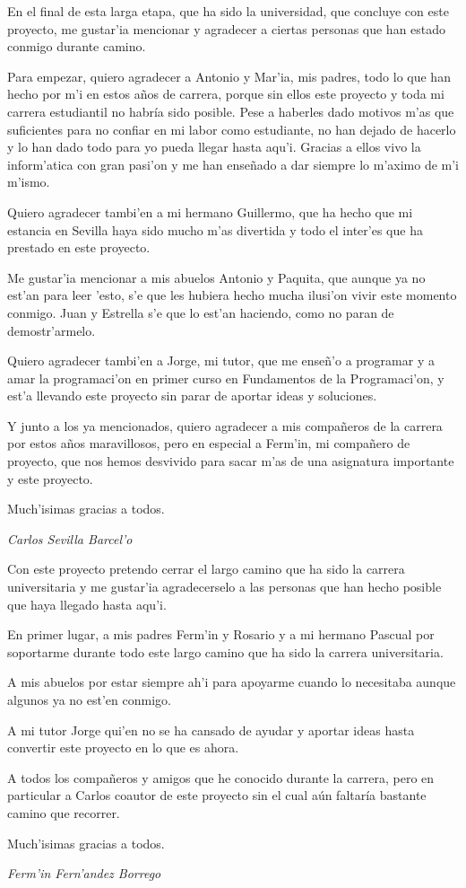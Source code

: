 
En el final de esta larga etapa, que ha sido la universidad, que concluye con este proyecto, me gustar'ia mencionar y agradecer a ciertas personas que han estado conmigo durante camino.

Para empezar, quiero agradecer a Antonio y Mar'ia, mis padres, todo lo que han hecho por m'i en estos años de carrera, porque sin ellos este proyecto y toda mi carrera estudiantil no habría sido posible.  Pese a haberles dado motivos m'as que suficientes para no confiar en mi labor como estudiante, no han dejado de hacerlo y lo han dado todo para yo pueda llegar hasta aqu'i. Gracias a ellos vivo la inform'atica con gran pasi'on y me han enseñado a dar siempre lo m'aximo de m'i m'ismo.

Quiero agradecer tambi'en a mi hermano Guillermo, que ha hecho que mi estancia en Sevilla haya sido mucho m'as divertida y todo el inter'es que ha prestado en este proyecto.

Me gustar'ia mencionar a mis abuelos Antonio y Paquita, que aunque ya no est'an para leer 'esto, s'e que les hubiera hecho mucha ilusi'on vivir este momento conmigo. Juan y Estrella s'e que lo est'an haciendo, como no paran de demostr'armelo.

Quiero agradecer tambi'en a Jorge, mi tutor, que me enseñ'o a programar y a amar la programaci'on en primer curso en Fundamentos de la Programaci'on, y est'a llevando este proyecto sin parar de aportar ideas y soluciones. 

Y junto a los ya mencionados, quiero agradecer a mis compañeros de la carrera por estos años maravillosos, pero en especial a Ferm'in, mi compañero de proyecto, que nos hemos desvivido para sacar m'as de una asignatura importante y este proyecto.

Much'isimas gracias a todos. 
\begin{flushright}
\emph{Carlos Sevilla Barcel'o}
\end{flushright}
\hfill \break

Con este proyecto pretendo cerrar el largo camino que ha sido la carrera universitaria y me gustar'ia agradecerselo a las personas que han hecho posible que haya llegado hasta aqu'i.

En primer lugar, a mis padres Ferm'in y Rosario y a mi hermano Pascual por soportarme durante todo este largo camino que ha sido la carrera universitaria. 

A mis abuelos por estar siempre ah'i para apoyarme cuando lo necesitaba aunque algunos ya no est'en conmigo.

A mi tutor Jorge qui'en no se ha cansado de ayudar y aportar ideas hasta convertir este proyecto en lo que es ahora.

A todos los compañeros y amigos que he conocido durante la carrera, pero en particular a Carlos coautor de este proyecto sin el cual aún faltaría bastante camino que recorrer.

Much'isimas gracias a todos. 
\begin{flushright}
\emph{Ferm'in Fern'andez Borrego}
\end{flushright}